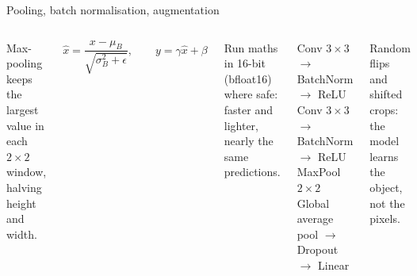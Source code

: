 \documentclass[aspectratio=169,11pt]{beamer}
\begin{document}
\begin{frame}{Pooling, batch normalisation, augmentation}
\begin{columns}[T]
\begin{bdef}[Pooling]
Max-pooling keeps the largest value in each $2\times2$ window, halving height and width.
\end{bdef}
\begin{bmath}
$\hat x=\dfrac{x-\mu_B}{\sqrt{\sigma_B^2+\epsilon}},\qquad y=\gamma\hat x+\beta$
\end{bmath}
\begin{bdef}
Run maths in 16-bit (bfloat16) where safe: faster and lighter, nearly the same predictions.
\end{bdef}
\begin{balgo}
\begin{algorithmic}[1]
  \State Conv $3\times3$ $\rightarrow$ BatchNorm $\rightarrow$ ReLU
  \State Conv $3\times3$ $\rightarrow$ BatchNorm $\rightarrow$ ReLU
  \State MaxPool $2\times2$
\EndFor
\State Global average pool $\rightarrow$ Dropout $\rightarrow$ Linear
\end{algorithmic}
\end{balgo}
\begin{bdef}[Augmentation]
Random flips and shifted crops: the model learns the object, not the pixels.
\end{bdef}
\end{columns}
\end{frame}
\end{document}
